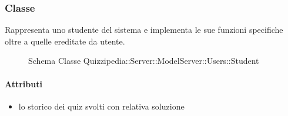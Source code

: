 \subsubsection{Classe }
Rappresenta uno studente del sistema e implementa le sue funzioni specifiche oltre a quelle ereditate da utente.
\begin{figure}[H]
\centering
\noindent{}
\caption[Schema Classe Student]{Schema Classe Quizzipedia::Server::ModelServer::Users::Student}
\end{figure}
\paragraph{Attributi}
\begin{itemize}
\item {}
\newline
lo storico dei quiz svolti con relativa soluzione
\end{itemize}
